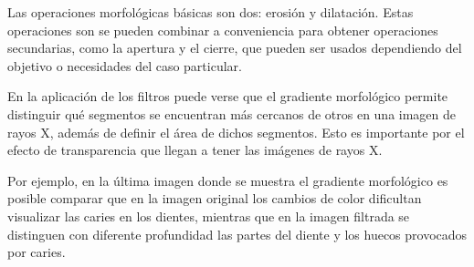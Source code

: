 \documentclass[11pt,a4paper,table]{article}
\begin{document}
Las operaciones morfológicas básicas son dos: erosión y dilatación.
Estas operaciones son se pueden combinar a conveniencia para obtener
operaciones secundarias, como la apertura y el cierre, que pueden ser
usados dependiendo del objetivo o necesidades del caso particular.

En la aplicación de los filtros puede verse que el gradiente morfológico
permite distinguir qué segmentos se encuentran más cercanos de otros en
una imagen de rayos X, además de definir el área de dichos segmentos.
Esto es importante por el efecto de transparencia que llegan a tener las
imágenes de rayos X.

Por ejemplo, en la última imagen donde se muestra el gradiente
morfológico es posible comparar que en la imagen original los cambios de
color dificultan visualizar las caries en los dientes, mientras que en
la imagen filtrada se distinguen con diferente profundidad las partes
del diente y los huecos provocados por caries.

    
    
    
        
\end{document}
